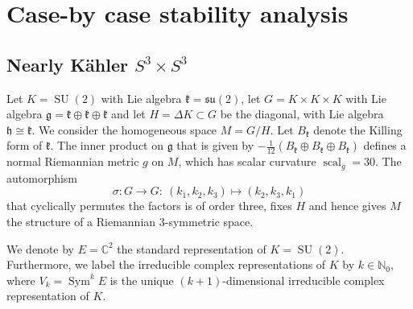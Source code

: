 \documentclass[12pt]{scrartcl}
\theoremstyle{plain}
\theoremstyle{definition}
\newcommand{\C}{\mathbb{C}}%
\newcommand{\N}{\mathbb{N}}%
\newcommand{\scal}{\operatorname{scal}}%
\newcommand{\Sym}{\operatorname{Sym}}%
\newcommand{\SU}{\operatorname{SU}}%
\newcommand{\su}{\mathfrak{su}}%
\newcommand{\h}{\mathfrak{h}}%
\newcommand{\g}{\mathfrak{g}}%
\renewcommand{\k}{\mathfrak{k}}%
\begin{document}
\section{Case-by case stability analysis}
\label{sec:examples}

\subsection{Nearly Kähler $S^3\times S^3$}
\label{sec:s3xs3}

Let $K=\SU(2)$ with Lie algebra $\k=\su(2)$, let $G=K\times K\times K$ with Lie algebra $\g=\k\oplus\k\oplus\k$ and let $H=\Delta K\subset G$ be the diagonal, with Lie algebra $\h\cong\k$. We consider the homogeneous space $M=G/H$. Let $B_\k$ denote the Killing form of $\k$. The inner product on $\g$ that is given by $-\frac{1}{12}(B_\k\oplus B_\k\oplus B_\k)$ defines a normal Riemannian metric $g$ on $M$, which has scalar curvature $\scal_g=30$. The automorphism
\[\sigma: G\to G:\ (k_1,k_2,k_3)\mapsto(k_2,k_3,k_1)\]
that cyclically permutes the factors is of order three, fixes $H$ and hence gives $M$ the structure of a Riemannian $3$-symmetric space.

We denote by $E=\C^2$ the standard representation of $K=\SU(2)$. Furthermore, we label the irreducible complex representations of $K$ by $k\in\N_0$, where $V_k=\Sym^kE$ is the unique $(k+1)$-dimensional irreducible complex representation of $K$.
\end{document}
